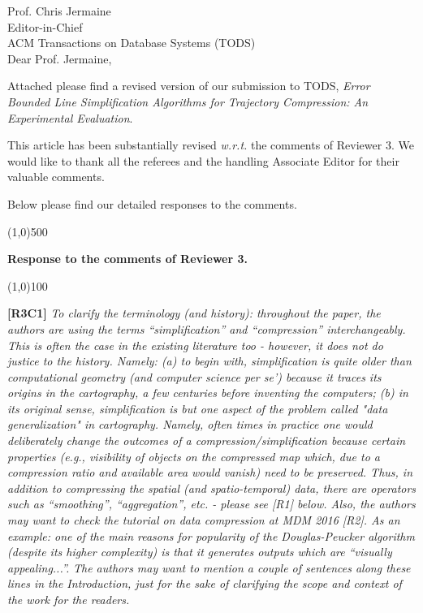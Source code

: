 \documentclass{letter}
\newcommand{\wrt}{\emph{w.r.t.}\xspace}
\begin{document}
Prof. {Chris Jermaine} \\
Editor-in-Chief		\\
ACM Transactions on Database Systems (TODS)	\\



Dear Prof. Jermaine,

Attached please find a revised version of our submission to TODS, \emph{Error Bounded Line Simplification Algorithms for Trajectory Compression: An Experimental Evaluation}.


This article has been substantially revised \wrt the comments of Reviewer 3.
We would like to thank all the referees {and the handling Associate Editor} for their valuable comments.

Below please find our detailed responses to the comments.





\line(1,0){500}

\textbf{Response to the comments of Reviewer 3.}

\line(1,0){100}

\textbf{[R3C1]} \emph{
To clarify the terminology (and history): throughout the paper, the authors are using the terms ``simplification'' and ``compression'' interchangeably. This is often the case in the existing literature too - however, it does not do justice to the history. Namely: (a) to begin with, simplification is quite older than computational geometry (and computer science per se') because it traces its origins in the cartography, a few centuries before inventing the computers; (b) in its original sense, simplification is but one aspect of the problem called "data generalization" in cartography. Namely, often times in practice one would deliberately change the outcomes of a compression/simplification because certain properties (e.g., visibility of objects on the compressed map which, due to a compression ratio and available area would vanish) need to be preserved. Thus, in addition to compressing the spatial (and spatio-temporal) data, there are operators such as ``smoothing'', ``aggregation'', etc. - please see [R1] below. Also, the authors may want to check the tutorial on data compression at MDM 2016 [R2]. As an example: one of the main reasons for popularity of the Douglas-Peucker algorithm (despite its higher complexity) is that it generates outputs which are ``visually appealing...''.}
%
\emph{The authors may want to mention a couple of sentences along these lines in the Introduction, just for the sake of clarifying the scope and context of the work for the readers.}
\end{document}

